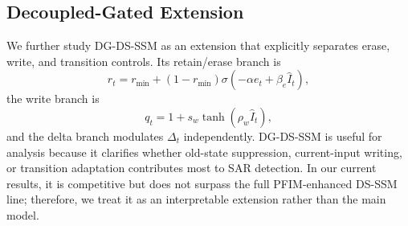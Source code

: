 \documentclass[10pt,twocolumn]{article}
\begin{document}
\subsection{Decoupled-Gated Extension}

We further study DG-DS-SSM as an extension that explicitly separates erase, write, and transition controls. Its retain/erase branch is
\begin{equation}
  r_t = r_{\min} + (1-r_{\min})\sigma(-\alpha e_t+\beta_e\hat{I}_t),
\end{equation}
the write branch is
\begin{equation}
  q_t = 1+s_w\tanh(\rho_w\hat{I}_t),
\end{equation}
and the delta branch modulates $\Delta_t$ independently. DG-DS-SSM is useful for analysis because it clarifies whether old-state suppression, current-input writing, or transition adaptation contributes most to SAR detection. In our current results, it is competitive but does not surpass the full PFIM-enhanced DS-SSM line; therefore, we treat it as an interpretable extension rather than the main model.
\end{document}
